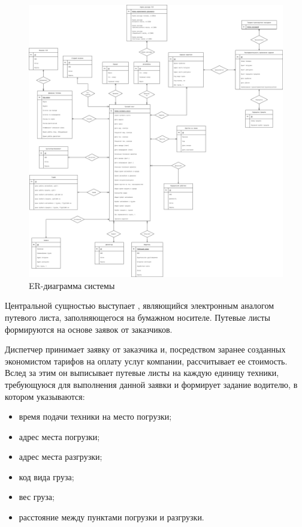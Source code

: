 \documentclass[../nirs.tex]{subfiles}
\begin{document}
\begin{figure}[hp!]
	\centering
	\includegraphics[keepaspectratio,width=\textwidth]{./images/2_1_3_er-diagram.png}
	\caption{ER-диаграмма системы}
	\label{fig:2_1_3_er_diagram}
\end{figure}

\pagebreak

Центральной сущностью выступает , являющийся
электронным аналогом путевого листа, заполняющегося на бумажном носителе.
Путевые листы формируются на основе заявок от заказчиков.

Диспетчер принимает заявку от заказчика и, посредством заранее созданных
экономистом тарифов на оплату услуг компании, рассчитывает ее стоимость. Вслед
за этим он выписывает путевые листы на каждую единицу техники, требующуюся для
выполнения данной заявки и формирует задание водителю, в котором указываются:
\begin{itemize}
	\item время подачи техники на место погрузки;
	\item адрес места погрузки;
	\item адрес места разгрузки;
	\item код вида груза;
	\item вес груза;
	\item расстояние между пунктами погрузки и разгрузки.
\end{itemize}
\end{document}
